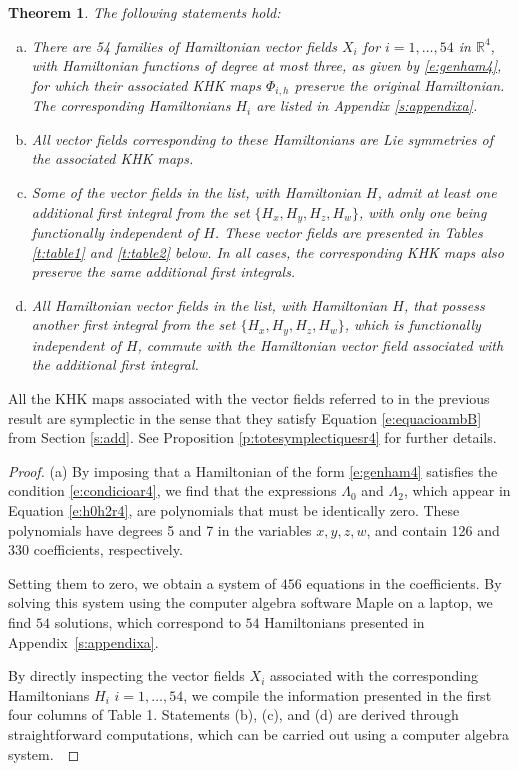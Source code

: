 \documentclass[11pt]{article}
\newtheorem {theorem} {Theorem}%
\begin{document}
  \begin{theorem}\label{t:Hamiltonians de R4} The following statements hold:
  \begin{enumerate}[(a)]
  \item  There are 54 families of Hamiltonian vector fields $X_i$ for $i = 1, \dots, 54 $ in $\mathbb{R}^4$, with Hamiltonian functions of degree at most three, as given by \eqref{e:genham4}, for which their associated KHK maps $\Phi_{i,h}$ preserve the original Hamiltonian. The corresponding Hamiltonians $H_i$ are listed in Appendix \ref{s:appendixa}.
  \item All vector fields corresponding to these Hamiltonians are Lie symmetries of the associated KHK maps.
\item     Some of the vector fields in the list, with Hamiltonian $H$, admit at least one additional first integral from the set $\{ H_x, H_y, H_z, H_w \}$, with only one being functionally independent of $H$. These vector fields are presented in Tables \ref{t:table1} and \ref{t:table2} below.
In all cases, the corresponding KHK maps  also preserve the same additional first integrals.
  \item All Hamiltonian vector fields in the list, with Hamiltonian $H$, that possess another first integral from the set $ \{H_x, H_y, H_z, H_w\}$, which is functionally independent of $H$, commute with the Hamiltonian vector field associated with the additional first integral.
  \end{enumerate}
  \end{theorem}
  
  
All the KHK maps associated with the vector fields referred to in the previous result are symplectic in the sense that they satisfy Equation \eqref{e:equacioambB} from Section \ref{s:add}. See Proposition \ref{p:totesymplectiquesr4} for further details.

  \begin{proof}
(a) By imposing that a Hamiltonian of the form \eqref{e:genham4} satisfies the condition \eqref{e:condicioar4}, we find that the expressions $ \Lambda_0$ and $\Lambda_2$, which appear in Equation \eqref{e:h0h2r4}, are polynomials that must be identically zero. These polynomials have degrees 5 and 7 in the variables $x, y, z, w$, and contain 126 and 330 coefficients, respectively.

Setting them to zero, we obtain a system of $456$ equations in the coefficients. By solving this system using the computer algebra software Maple on a laptop, we find $54$  solutions, which correspond to  $54$ Hamiltonians presented in 
Appendix~\ref{s:appendixa}.





By directly inspecting the vector fields $X_i$ associated with the corresponding Hamiltonians $H_i$ $i=1,\ldots,54$, we compile the information presented in the first four columns of Table 1. Statements (b), (c), and (d) are derived through straightforward computations, which can be carried out using a computer algebra system.~
\end{proof}
\end{document}
